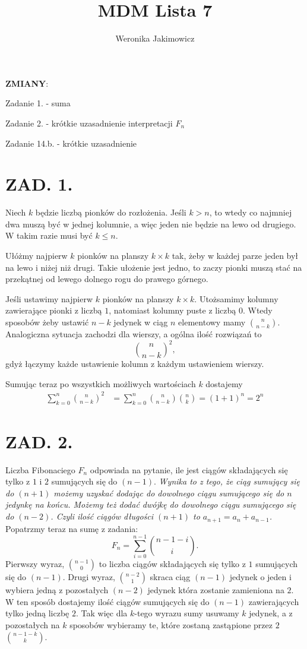 \documentclass{article}[13pt]
\author{Weronika Jakimowicz}
\title{MDM Lista 7}
\date{}
\begin{document}
\maketitle

\textbf{\large\color{def}ZMIANY}:\smallskip

\point Zadanie 1. - suma

\point Zadanie 2. - krótkie uzasadnienie interpretacji $F_n$

\point Zadanie 14.b. - krótkie uzasadnienie

\section*{ZAD. 1.}

Niech $k$ będzie liczbą pionków do rozłożenia. Jeśli $k>n$, to wtedy co najmniej dwa muszą być w jednej kolumnie, a więc jeden nie będzie na lewo od drugiego. W takim razie musi być $k\leq n$.
\medskip

Ułóżmy najpierw $k$ pionków na planszy $k\times k$ tak, żeby w każdej parze jeden był na lewo i niżej niż drugi. Takie ułożenie jest jedno, to zaczy pionki muszą stać na przekątnej od lewego dolnego rogu do prawego górnego.

Jeśli ustawimy najpierw $k$ pionków na planszy $k\times k$. Utożsamimy kolumny zawierające pionki z liczbą $1$, natomiast kolumny puste z liczbą $0$. Wtedy sposobów żeby ustawić $n-k$ jedynek w ciąg $n$ elementowy mamy ${n\choose n-k}$. Analogiczna sytuacja zachodzi dla wierszy, a ogólna ilość rozwiązań to 
$${n\choose n-k}^2,$$ 
gdyż łączymy każde ustawienie kolumn z każdym ustawieniem wierszy.
\medskip

Sumując teraz po wszystkich możliwych wartościach $k$ dostajemy
\begin{align*}
    \sum\limits_{k=0}^n{n\choose n-k}^2&=\sum\limits_{k=0}^n{n\choose n-k}{n\choose k}=(1+1)^n=2^n
\end{align*}

\section*{ZAD. 2.}

Liczba Fibonaciego $F_n$ odpowiada na pytanie, ile jest ciągów składających się tylko z $1$ i $2$ sumujących się do $(n-1)$. \emph{Wynika to z tego, że ciąg sumujący się do $(n+1)$ możemy uzyskać dodając do dowolnego ciągu sumującego się do $n$ jedynkę na końcu. Możemy też dodać dwójkę do dowolnego ciągu sumującego się do $(n-2)$. Czyli ilość ciągów długości $(n+1)$ to $a_{n+1}=a_n+a_{n-1}$.} Popatrzmy teraz na sumę z zadania:
$$F_n=\sum\limits_{i=0}^{n-1}{n-1-i\choose i}.$$
Pierwszy wyraz, ${n-1\choose 0}$ to liczba ciągów składających się tylko z $1$ sumujących się do $(n-1)$. Drugi wyraz, ${n-2\choose 1}$ skraca ciąg $(n-1)$ jedynek o jeden i wybiera jedną z pozostałych $(n-2)$ jedynek która zostanie zamieniona na $2$. W ten sposób dostajemy ilość ciągów sumujących się do $(n-1)$ zawierających tylko jedną liczbę $2$. Tak więc dla $k$-tego wyrazu sumy usuwamy $k$ jedynek, a z pozostałych na $k$ sposobów wybieramy te, które zostaną zastąpione przez $2$ ${n-1-k\choose k}$.
\bigskip
\end{document}

